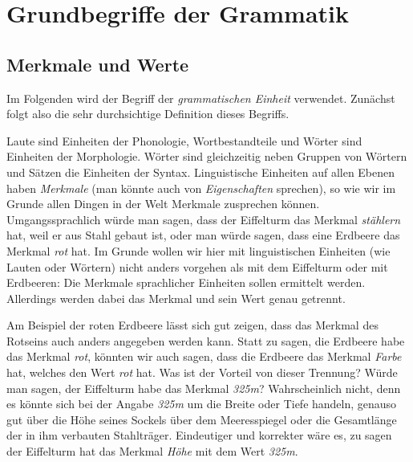 \chapter{Grundbegriffe der Grammatik}

\label{sec:grundbegriffe}

\section{Merkmale und Werte}

\label{sec:merkmaleundwerte}

Im Folgenden wird der Begriff der \textit{grammatischen Einheit} verwendet.
Zunächst folgt also die sehr durchsichtige Definition dieses Begriffs.



Laute sind Einheiten der Phonologie, Wortbestandteile und Wörter sind Einheiten der Morphologie.
Wörter sind gleichzeitig neben Gruppen von Wörtern und Sätzen die Einheiten der Syntax.
Linguistische Einheiten auf allen Ebenen haben \textit{Merkmale} (man könnte auch von \textit{Eigenschaften} sprechen), so wie wir im Grunde allen Dingen in der Welt Merkmale zusprechen können.
Umgangssprachlich würde man sagen, dass der Eiffelturm das Merkmal \textit{stählern} hat, weil er aus Stahl gebaut ist, oder man würde sagen, dass eine Erdbeere das Merkmal \textit{rot} hat.
Im Grunde wollen wir hier mit linguistischen Einheiten (wie Lauten oder Wörtern) nicht anders vorgehen als mit dem Eiffelturm oder mit Erdbeeren:
Die Merkmale sprachlicher Einheiten sollen ermittelt werden.
Allerdings werden dabei das Merkmal und sein Wert genau getrennt.


Am Beispiel der roten Erdbeere lässt sich gut zeigen, dass das Merkmal des Rotseins auch anders angegeben werden kann.
Statt zu sagen, die Erdbeere habe das Merkmal \textit{rot}, könnten wir auch sagen, dass die Erdbeere das Merkmal \textit{Farbe} hat, welches den Wert \textit{rot} hat.
Was ist der Vorteil von dieser Trennung?
Würde man sagen, der Eiffelturm habe das Merkmal \textit{325m}?
Wahrscheinlich nicht, denn es könnte sich bei der Angabe \textit{325m} um die Breite oder Tiefe handeln, genauso gut über die Höhe seines Sockels über dem Meeresspiegel oder die Gesamtlänge der in ihm verbauten Stahlträger.
Eindeutiger und korrekter wäre es, zu sagen der Eiffelturm hat das Merkmal \textit{Höhe} mit dem Wert \textit{325m}.

